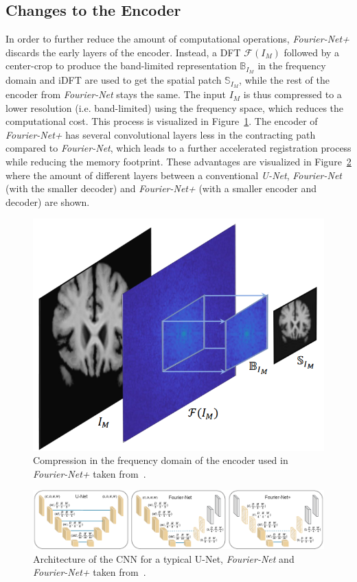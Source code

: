\documentclass[english,version-2022-01]{uzl-thesis} %
\begin{document}
\subsection{Changes to the Encoder} \label{SubSec:ChangesEncoder}
In order to further reduce the amount of computational operations, \emph{Fourier-Net+} discards the early layers of the encoder. Instead, a DFT $\mathcal{F}(I_M)$ followed by a center-crop to produce the band-limited representation $\mathbb{B}_{I_M}$ in the frequency domain and iDFT are used to get the spatial patch $\mathbb{S}_{I_M}$, while the rest of the encoder from \emph{Fourier-Net} stays the same. The input $I_M$ is thus compressed to a lower resolution (i.e. band-limited) using the frequency space, which reduces the computational cost. This process is visualized in Figure~\ref{fig:Fourier-Net+EncoderCompression}. The encoder of \emph{Fourier-Net+} has several convolutional layers less in the contracting path compared to \emph{Fourier-Net}, which leads to a further accelerated registration process while reducing the memory footprint. These advantages are visualized in Figure~\ref{fig:Fourier-Net+CNN} where the amount of different layers between a conventional \emph{U-Net}, \emph{Fourier-Net} (with the smaller decoder) and \emph{Fourier-Net+} (with a smaller encoder and decoder) are shown.
\begin{figure}[htpb]
	\centering
	\graphicspath{{images/}{\main/images/}}
	\includegraphics[width=.5\linewidth]{CompressionEncoder.png} 
	\caption{Compression in the frequency domain of the encoder used in \emph{Fourier-Net+} taken from~\cite{Fourier-Net+}.}
	\label{fig:Fourier-Net+EncoderCompression}
\end{figure}
\begin{figure}[htpb]
	\centering
	\graphicspath{{images/}{\main/images/}}
	\includegraphics[width=\linewidth]{ArchitectureFourier-Net+CNN.png} 
	\caption{Architecture of the CNN for a typical U-Net, \emph{Fourier-Net} and \emph{Fourier-Net+} taken from~\cite{Fourier-Net+}.}
	\label{fig:Fourier-Net+CNN}
\end{figure}
\end{document}
